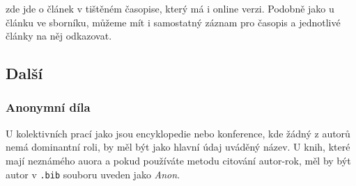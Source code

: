 \documentclass[a4paper,10pt]{ltxdockit}
\def\t|#1|{\texttt{#1}}
\begin{document}
\noindent zde jde o článek v tištěném časopise, který má i online verzi. Podobně jako u článku ve sborníku, můžeme mít i samostatný záznam pro časopis a jednotlivé články na něj odkazovat.

\subsection{Další}

\subsubsection{Anonymní díla}

U kolektivních prací jako jsou encyklopedie nebo konference, kde žádný z autorů
nemá dominantní roli, by měl být jako hlavní údaj uváděný název. U knih, které
mají neznámého auora a pokud používáte metodu citování autor-rok, měl by být
autor v \t|.bib| souboru uveden jako \textit{Anon}.

\nocite{*}
\printbibliography[title={Ukázková bibliografie},heading={bibnumbered}]
\end{document}
